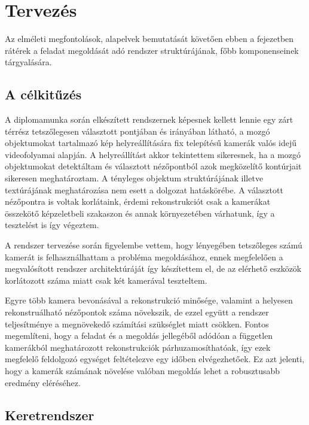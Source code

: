 \chapter{Tervezés \label{chapter3}}

Az elméleti megfontolások, alapelvek bemutatását követően ebben a fejezetben rátérek a feladat megoldását adó rendszer struktúrájának, főbb komponenseinek tárgyalására.

\section{A célkitűzés}

A diplomamunka során elkészített rendszernek képesnek kellett lennie egy zárt térrész tetszőlegesen választott pontjában és irányában látható, a mozgó objektumokat tartalmazó kép helyreállítására fix telepítésű kamerák valós idejű videofolyamai alapján. A helyreállítást akkor tekintettem sikeresnek, ha a mozgó objektumokat detektáltam és választott nézőpontból azok megközelítő kontúrjait sikeresen meghatároztam. A tényleges objektum struktúrájának illetve textúrájának meghatározása nem esett a dolgozat hatáskörébe. A választott nézőpontra is voltak korlátaink, érdemi rekonstrukciót csak a kamerákat összekötő képzeletbeli szakaszon és annak környezetében várhatunk, így a tesztelést is így végeztem.

A rendszer tervezése során figyelembe vettem, hogy lényegében tetszőleges számú kamerát is felhasználhattam a probléma megoldásához, ennek megfelelően a megvalósított rendszer architektúráját így készítettem el, de az elérhető eszközök korlátozott száma miatt csak két kamerával teszteltem.

Egyre több kamera bevonásával a rekonstrukció minősége, valamint a helyesen rekonstruálható nézőpontok száma növekszik, de ezzel együtt a rendszer teljesítménye a megnövekedő számítási szükséglet miatt csökken. Fontos megemlíteni, hogy a feladat és a megoldás jellegéből adódóan a független kamerákból meghatározott rekonstrukciók párhuzamosíthatóak, így ezek megfelelő feldolgozó egységet feltételezve egy időben elvégezhetőek. Ez azt jelenti, hogy a kamerák számának növelése valóban megoldás lehet a robusztusabb eredmény eléréséhez.

\section{Keretrendszer}

